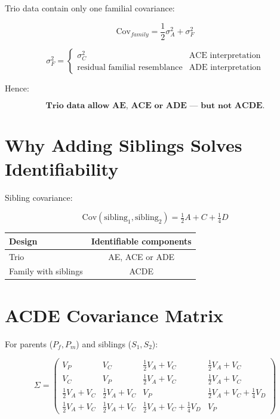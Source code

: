 \documentclass[12pt]{article}
\begin{document}
Trio data contain only one familial covariance:

\[
\text{Cov}_{family} = \frac12\sigma_A^2 + \sigma_F^2
\]

\[
\sigma_F^2 =
\begin{cases}
\sigma_C^2 & \text{ACE interpretation} \\
\text{residual familial resemblance} & \text{ADE interpretation}
\end{cases}
\]

Hence:

\[
\textbf{Trio data allow AE, ACE or ADE --- but not ACDE.}
\]

\section{Why Adding Siblings Solves Identifiability}

Sibling covariance:

\[
\text{Cov}(\text{sibling}_1,\text{sibling}_2)
= \tfrac12 A + C + \tfrac14 D
\]

\begin{center}
\begin{tabular}{lc}
\toprule
Design & Identifiable components \\ \midrule
Trio & AE, ACE or ADE \\
Family with siblings & ACDE \\
\bottomrule
\end{tabular}
\end{center}

\section{ACDE Covariance Matrix}

For parents ($P_f,P_m$) and siblings ($S_1,S_2$):

\[
\Sigma =
\begin{pmatrix}
V_P & V_C & \tfrac12 V_A + V_C & \tfrac12 V_A + V_C \\
V_C & V_P & \tfrac12 V_A + V_C & \tfrac12 V_A + V_C \\
\tfrac12 V_A + V_C & \tfrac12 V_A + V_C & V_P &
\tfrac12 V_A + V_C + \tfrac14 V_D \\
\tfrac12 V_A + V_C & \tfrac12 V_A + V_C &
\tfrac12 V_A + V_C + \tfrac14 V_D & V_P
\end{pmatrix}
\]

\end{document}
